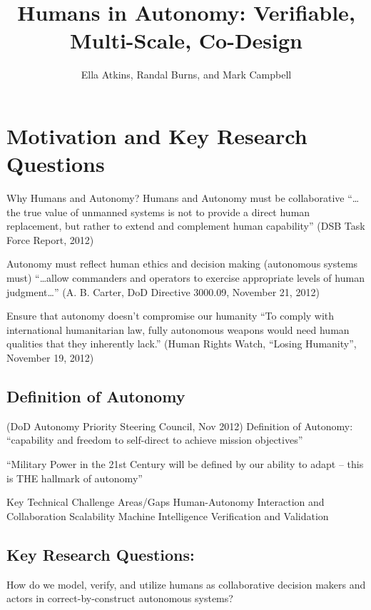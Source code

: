 \documentclass[11pt]{dssg}
\begin{document}
\title{Humans in Autonomy: Verifiable, Multi-Scale, Co-Design}

\author{Ella Atkins, Randal Burns, and Mark Campbell}


\maketitle


\section*{Motivation and Key Research Questions}

Why Humans and Autonomy?
Humans and Autonomy must be collaborative
“…the true value of unmanned systems is not to provide a direct human replacement, but rather to extend and complement human capability” (DSB Task Force Report, 2012)

Autonomy must reflect human ethics and decision making
(autonomous systems must) “…allow commanders and operators to exercise appropriate levels of human judgment…” (A. B. Carter, DoD Directive 3000.09, November 21, 2012)

Ensure that autonomy doesn’t compromise our humanity
“To comply with international humanitarian law, fully autonomous weapons would need human qualities that they inherently lack.” (Human Rights Watch, “Losing Humanity”, November 19, 2012)


\subsection*{Definition of Autonomy}
(DoD Autonomy Priority Steering Council, Nov 2012)
Definition of Autonomy: “capability and freedom to self-direct to achieve mission objectives”

“Military Power in the 21st Century will be defined by our ability to adapt – this is THE hallmark of autonomy”

Key Technical Challenge Areas/Gaps
Human-Autonomy Interaction and Collaboration
Scalability
Machine Intelligence
Verification and Validation

\subsection*{Key Research Questions:}

How do we model, verify, and utilize humans as collaborative decision makers and actors in correct-by-construct autonomous systems?
\end{document}
